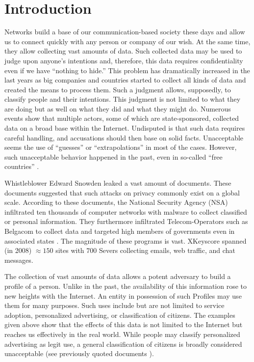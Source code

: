 \documentclass[acmsmall, screen]{acmart}
\begin{document}
\section{Introduction\label{sec:introduction}}
Networks build a base of our communication-based society these days and allow us to connect quickly with any person or company of our wish. At the same time, they allow collecting vast amounts of data. Such collected data may be used to judge upon anyone's intentions and, therefore, this data requires confidentiality even if we have ``nothing to hide.'' This problem has dramatically increased in the last years as big companies and countries started to collect all kinds of data and created the means to process them. Such a judgment allows, supposedly, to classify people and their intentions. This judgment is not limited to what they are doing but as well on what they did and what they might do. Numerous events show that multiple actors, some of which are state-sponsored, collected data on a broad base within the Internet. Undisputed is that such data requires careful handling, and accusations should then base on solid facts. Unacceptable seems the use of ``guesses'' or ``extrapolations'' in most of the cases. However, such unacceptable behavior happened in the past, even in so-called ``free countries'' \cite{Leuenberger1989}.

Whistleblower Edward Snowden leaked a vast amount of documents. These documents suggested that such attacks on privacy commonly exist on a global scale. According to these documents, the National Security Agency (NSA) infiltrated ten thousands of computer networks with malware to collect classified or personal information. They furthermore infiltrated Telecom-Operators such as Belgacom to collect data and targeted high members of governments even in associated states \cite{NCR2013,XKeyscore,Ball2013,Ackerman2013,Greenberg2013}. The magnitude of these programs is vast. XKeyscore spanned (in 2008) $\approx150$ sites with $700$ Severs collecting emails, web traffic, and chat messages.

The collection of vast amounts of data allows a potent adversary to build a  profile of a person. Unlike in the past, the availability of this information rose to new heights with the Internet. An entity in possession of such Profiles may use them for many purposes. Such uses include but are not limited to service adoption, personalized advertising, or classification of citizens. The examples given above show that the effects of this data is not limited to the Internet but reaches us effectively in the real world. While people may classify personalized advertising as legit use, a general classification of citizens is broadly considered unacceptable (see previously quoted documents \cite{NCR2013,XKeyscore,Ball2013,Greenberg2013,Leuenberger1989}).
\end{document}
